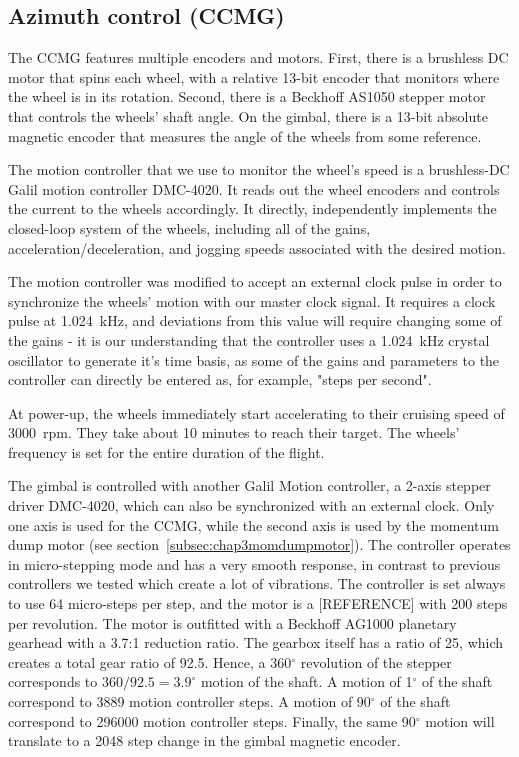 \subsection{Azimuth control (CCMG)}

The CCMG features multiple encoders and motors. First, there is a brushless DC motor that spins each wheel, with a relative 13-bit encoder that monitors where the wheel is in its rotation. Second, there is a Beckhoff AS1050 stepper motor that controls the wheels' shaft angle. On the gimbal, there is a 13-bit  absolute magnetic encoder that measures the angle of the wheels from some reference. 

The motion controller that we use to monitor the wheel's speed is a brushless-DC Galil motion controller DMC-4020. It reads out the wheel encoders and controls the current to the wheels accordingly. It directly, independently implements the closed-loop system of the wheels, including all of the gains, acceleration/deceleration, and jogging speeds associated with the desired motion.

The motion controller was modified to accept an external clock pulse in order to synchronize the wheels' motion with our master clock signal. It requires a clock pulse at 1.024~kHz, and deviations from this value will require changing some of the gains - it is our understanding that the controller uses a 1.024~kHz crystal oscillator to generate it's time basis, as some of the gains and parameters to the controller can directly be entered as, for example, "steps per second". 

At power-up, the wheels immediately start accelerating to their cruising speed of 3000~rpm. They take about 10 minutes to reach their target. The wheels' frequency is set for the entire duration of the flight.

The gimbal is controlled with another Galil Motion controller, a 2-axis stepper driver DMC-4020, which can also be synchronized with an external clock. Only one axis is used for the CCMG, while the second axis is used by the momentum dump motor (see section~\ref{subsec:chap3momdumpmotor}). The controller operates in micro-stepping mode and has a very smooth response, in contrast to previous controllers we tested which create a lot of vibrations. The controller is set always to use 64 micro-steps per step, and the motor is a [REFERENCE] with 200 steps per revolution. The motor is outfitted with a Beckhoff AG1000 planetary gearhead with a 3.7:1 reduction ratio. The gearbox itself has a ratio of 25, which creates a total gear ratio of 92.5. Hence, a 360$^\circ$ revolution of the stepper corresponds to $360/92.5=3.9^\circ$ motion of the shaft. A motion of 1$^\circ$ of the shaft correspond to 3889 motion controller steps. A motion of 90$^\circ$ of the shaft correspond to 296000 motion controller steps. Finally, the same 90$^\circ$ motion will translate to a 2048 step change in the gimbal magnetic encoder.

